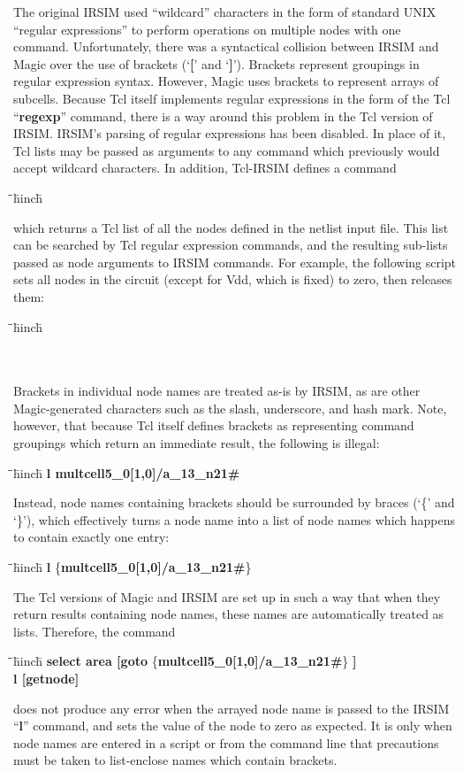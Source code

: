 \documentclass[letterpaper,twoside,12pt]{article}
\def\hinch{\hspace*{0.5in}}
\def\starti{\begin{center}\begin{tabbing}\hinch\=\hinch\=\hinch\=hinch\hinch\=\kill}
\def\endi{\end{tabbing}\end{center}}
\def\ii{\>\>\>}
\def\bstf{\bfseries\ttfamily}
\begin{document}
The original IRSIM used ``wildcard'' characters in the form of standard
UNIX ``regular expressions'' to perform operations on multiple nodes
with one command.  Unfortunately, there was a syntactical collision
between IRSIM and Magic over the use of brackets (`{\bstf [}'
and `{\bstf ]}').  Brackets represent groupings in regular expression
syntax.  However, Magic uses brackets to represent arrays of subcells.
Because Tcl itself implements regular expressions in the form of the
Tcl ``{\bstf regexp}'' command, there is a way around this problem in
the Tcl version of IRSIM.  IRSIM's parsing of regular expressions has
been disabled.  In place of it, Tcl lists may be passed as arguments
to any command which previously would accept wildcard characters.  In
addition, Tcl-IRSIM defines a command
\starti
  \ii {\bstf listnodes}
\endi
which returns a Tcl list of all the nodes defined in the netlist
input file.  This list can be searched by Tcl regular expression
commands, and the resulting sub-lists passed as node arguments to
IRSIM commands.  For example, the following script sets all nodes
in the circuit (except for {\ttfamily Vdd}, which is fixed) to
zero, then releases them:
\starti
  \ii {\bstf set nl [listnodes]} \\
  \ii {\bstf l \$nl} \\
  \ii {\bstf s} \\
  \ii {\bstf x \$nl}
\endi

Brackets in individual node names are treated as-is by IRSIM, as are
other Magic-generated characters such as the slash, underscore, and
hash mark.  Note, however, that because Tcl itself defines brackets
as representing command groupings which return an immediate result,
the following is illegal:
\starti
  \ii {\itshape \%} {\bstf l multcell5\_0[1,0]/a\_13\_n21\#} \\
  \ii {\ttfamily invalid command name "1,0"}
\endi
Instead, node names containing brackets should be surrounded by
braces (`\{' and `\}'), which effectively turns
a node name into a list of node names which happens to contain
exactly one entry:
\starti
  \ii {\itshape \%} {\bstf l }\{{\bstf multcell5\_0[1,0]/a\_13\_n21\#}\} \\
\endi
The Tcl versions of Magic and IRSIM are set up in such a way that
when they return results containing node names, these names are
automatically treated as lists.  Therefore, the command
\starti
  \ii {\itshape \%} {\bstf select area [goto }\{{\bstf multcell5\_0[1,0]/a\_13\_n21\#}\}
	{\bstf ]} \\
  \ii {\itshape \%} {\bstf l [getnode]}
\endi
does not produce any error when the arrayed node name is passed to the
IRSIM ``{\bstf l}'' command, and sets the value of the node to zero as
expected.  It is only when node names are entered in a script or from
the command line that precautions must be taken to list-enclose names
which contain brackets.
\end{document}
